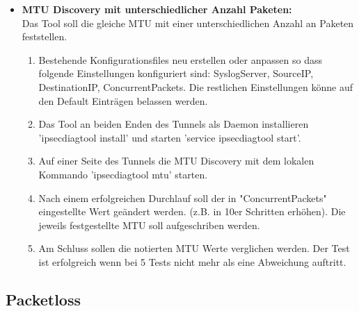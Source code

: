 \begin{itemize}
\item[\Square] \textbf{MTU Discovery mit unterschiedlicher Anzahl Paketen:}\\
Das Tool soll die gleiche MTU mit einer unterschiedlichen Anzahl an Paketen feststellen.
\begin{enumerate} \itemsep1pt \parskip0pt 
  \item Bestehende Konfigurationsfiles neu erstellen oder anpassen so dass folgende Einstellungen konfiguriert sind: SyslogServer, SourceIP, DestinationIP, ConcurrentPackets. Die restlichen Einstellungen könne auf den Default Einträgen belassen werden.
  \item Das Tool an beiden Enden des Tunnels als Daemon installieren 'ipsecdiagtool install' und starten 'service ipsecdiagtool start'.
  \item Auf einer Seite des Tunnels die MTU Discovery mit dem lokalen Kommando 'ipsecdiagtool mtu' starten.
  \item Nach einem erfolgreichen Durchlauf soll der in "ConcurrentPackets" eingestellte Wert geändert werden. (z.B. in 10er Schritten erhöhen). Die jeweils festgestellte MTU soll aufgeschriben werden.
    \item Am Schluss sollen die notierten MTU Werte verglichen werden. Der Test ist erfolgreich wenn bei 5 Tests nicht mehr als eine Abweichung auftritt.
\end{enumerate}

\end{itemize}
\subsection{Packetloss}
